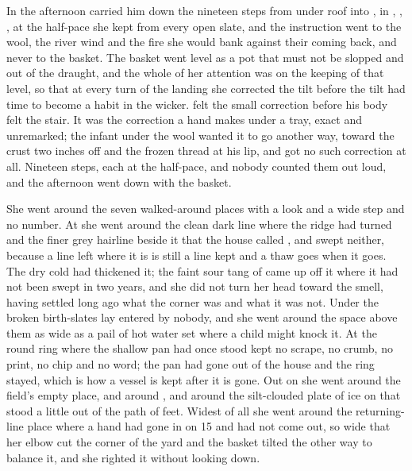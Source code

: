 In the afternoon  carried him down the nineteen steps from under  roof into , in , , , at the half-pace she kept from every open slate, and the instruction went to the wool, the river wind and the fire she would bank against their coming back, and never to the basket. The basket went level as a pot that must not be slopped and out of the draught, and the whole of her attention was on the keeping of that level, so that at every turn of the landing she corrected the tilt before the tilt had time to become a habit in the wicker.  felt the small correction before his body felt the stair. It was the correction a hand makes under a tray, exact and unremarked; the infant under the wool wanted it to go another way, toward the crust two inches off and the frozen thread at his lip, and got no such correction at all. Nineteen steps, each at the half-pace, and nobody counted them out loud, and the afternoon went down with the basket.

She went around the seven walked-around places with a look and a wide step and no number. At  she went around the clean dark line where the ridge had turned and the finer grey hairline beside it that the house called , and swept neither, because a line left where it is is still a line kept and a thaw goes when it goes. The dry cold had thickened it; the faint sour tang of  came up off it where it had not been swept in two years, and she did not turn her head toward the smell, having settled long ago what the corner was and what it was not. Under  the broken birth-slates lay entered by nobody, and she went around the space above them as wide as a pail of hot water set where a child might knock it. At  the round ring where the shallow pan had once stood kept no scrape, no crumb, no print, no chip and no word; the pan had gone out of the house and the ring stayed, which is how a vessel is kept after it is gone. Out on  she went around the field's empty place, and around , and around the silt-clouded plate of ice on  that stood a little out of the path of feet. Widest of all she went around the returning-line place where a hand had gone in on  15 and had not come out, so wide that her elbow cut the corner of the yard and the basket tilted the other way to balance it, and she righted it without looking down.

